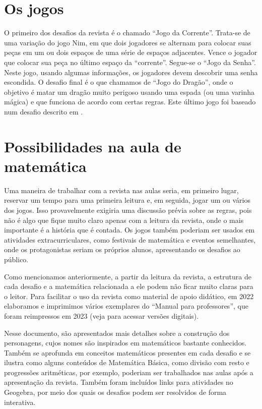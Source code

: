 \documentclass[12pt,oneside,a4paper]{article}
\begin{document}
\section{Os jogos}

O primeiro dos desafios da revista é o chamado “Jogo da Corrente”. Trata-se de uma variação do jogo Nim, em que dois jogadores se alternam para colocar suas peças em um ou dois espaços de uma série de espaços adjacentes. Vence o jogador que colocar sua peça no último espaço da “corrente”. Segue-se o “Jogo da Senha”. Neste jogo, usando algumas informações, os jogadores devem descobrir uma senha escondida. O desafio final é o que chamamos de “Jogo do Dragão”, onde o objetivo é matar um dragão muito perigoso usando uma espada (ou uma varinha mágica) e que funciona de acordo com certas regras. Este último jogo foi baseado num desafio descrito em \cite{Lewis}.

\section{Possibilidades na aula de matemática}

Uma maneira de trabalhar com a revista nas aulas seria, em primeiro lugar, reservar um tempo para uma primeira leitura e, em seguida, jogar um ou vários dos jogos. Isso provavelmente exigiria uma discussão prévia sobre as regras, pois não é algo que fique muito claro apenas com a leitura da revista, onde o mais importante é a história que é contada. Os jogos também poderiam ser usados em atividades extracurriculares, como festivais de matemática e eventos semelhantes, onde os protagonistas seriam os próprios alunos, apresentando os desafios ao público.

Como mencionamos anteriormente, a partir da leitura da revista, a estrutura de cada desafio e a matemática relacionada a ele podem não ficar muito claras para o leitor. Para facilitar o uso da revista como material de apoio didático, em 2022 elaboramos e imprimimos vários exemplares do “Manual para professores”, que foram reimpressos em 2023 (veja \cite{Visitas} para acessar versões digitais).

Nesse documento, são apresentados mais detalhes sobre a construção dos personagens, cujos nomes são inspirados em matemáticos bastante conhecidos. Também se aprofunda em conceitos matemáticos presentes em cada desafio e se ilustra como alguns conteúdos de Matemática Básica, como divisão com resto e progressões aritméticas, por exemplo, poderiam ser trabalhados nas aulas após a apresentação da revista. Também foram incluídos links para atividades no Geogebra, por meio dos quais os desafios podem ser resolvidos de forma interativa.
\end{document}
